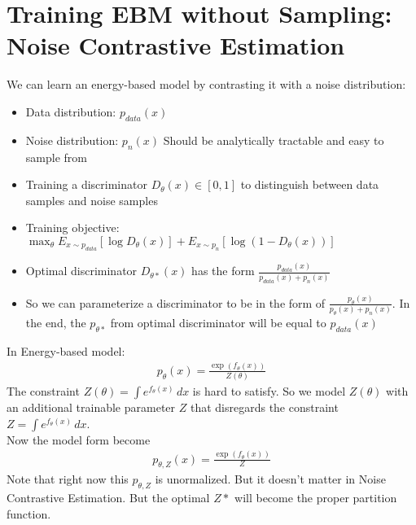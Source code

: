 \section{Training EBM without Sampling: Noise Contrastive Estimation} 
We can learn an energy-based model by contrasting it with a noise distribution: 
    \begin{itemize}
        \item Data distribution: $p_{data}(x)$
        \item Noise distribution: $p_n(x)$ Should be analytically tractable and easy to sample from 
        \item Training a discriminator $D_\theta(x)\in [0,1]$ to distinguish between data samples and noise samples
        \item Training objective: $\max_\theta E_{x\sim p_{data}}[\log D_\theta(x)] + E_{x\sim p_n}[\log(1-D_\theta(x))]$
        \item Optimal discriminator $D_{\theta*}(x)$ has the form $\frac{p_{data}(x)}{p_{data}(x) + p_n(x)}$
        \item So we can parameterize a discriminator to be in the form of $\frac{p_{\theta}(x)}{p_{\theta}(x) + p_n(x)}$. In the end, the $p_{\theta*}$ from optimal discriminator will be equal to $p_{data}(x)$
    \end{itemize}
In Energy-based model: 
    \begin{align*}
        p_\theta(x) = \frac{\exp(f_\theta(x))}{Z(\theta)}
    \end{align*}
The constraint $Z(\theta) = \int e^{f_\theta(x)} \,dx$ is hard to satisfy. So we model $Z(\theta)$ with an additional trainable parameter $Z$ that disregards the constraint $Z = \int e^{f_\theta(x)} \, dx$. \\


Now the model form become 
    \begin{align*}
        p_{\theta, Z}(x) = \frac{\exp(f_\theta(x))}{Z}
    \end{align*}
Note that right now this $p_{\theta,Z}$ is unormalized. But it doesn't matter in Noise Contrastive Estimation. But the optimal $Z*$ will become the proper partition function. \\


